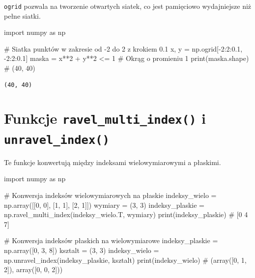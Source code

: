 \documentclass[
  polish,
  letterpaper,
  DIV=11,
  numbers=noendperiod]{scrreprt}
\newenvironment{Shaded}{\begin{snugshade}}{\end{snugshade}}
\newcommand{\BuiltInTok}[1]{\textcolor[rgb]{0.00,0.23,0.31}{#1}}
\newcommand{\CommentTok}[1]{\textcolor[rgb]{0.37,0.37,0.37}{#1}}
\newcommand{\DecValTok}[1]{\textcolor[rgb]{0.68,0.00,0.00}{#1}}
\newcommand{\FloatTok}[1]{\textcolor[rgb]{0.68,0.00,0.00}{#1}}
\newcommand{\ImportTok}[1]{\textcolor[rgb]{0.00,0.46,0.62}{#1}}
\newcommand{\NormalTok}[1]{\textcolor[rgb]{0.00,0.23,0.31}{#1}}
\newcommand{\OperatorTok}[1]{\textcolor[rgb]{0.37,0.37,0.37}{#1}}
\begin{document}
\texttt{ogrid} pozwala na tworzenie otwartych siatek, co jest pamięciowo
wydajniejsze niż pełne siatki.

\begin{Shaded}
\begin{Highlighting}[]
\ImportTok{import}\NormalTok{ numpy }\ImportTok{as}\NormalTok{ np}

\CommentTok{\# Siatka punktów w zakresie od {-}2 do 2 z krokiem 0.1}
\NormalTok{x, y }\OperatorTok{=}\NormalTok{ np.ogrid[}\OperatorTok{{-}}\DecValTok{2}\NormalTok{:}\DecValTok{2}\NormalTok{:}\FloatTok{0.1}\NormalTok{, }\OperatorTok{{-}}\DecValTok{2}\NormalTok{:}\DecValTok{2}\NormalTok{:}\FloatTok{0.1}\NormalTok{]}
\NormalTok{maska }\OperatorTok{=}\NormalTok{ x}\OperatorTok{**}\DecValTok{2} \OperatorTok{+}\NormalTok{ y}\OperatorTok{**}\DecValTok{2} \OperatorTok{\textless{}=} \DecValTok{1}  \CommentTok{\# Okrąg o promieniu 1}
\BuiltInTok{print}\NormalTok{(maska.shape)  }\CommentTok{\# (40, 40)}
\end{Highlighting}
\end{Shaded}

\begin{verbatim}
(40, 40)
\end{verbatim}

\section{\texorpdfstring{Funkcje \texttt{ravel\_multi\_index()} i
\texttt{unravel\_index()}}{Funkcje ravel\_multi\_index() i unravel\_index()}}\label{funkcje-ravel_multi_index-i-unravel_index}

Te funkcje konwertują między indeksami wielowymiarowymi a płaskimi.

\begin{Shaded}
\begin{Highlighting}[]
\ImportTok{import}\NormalTok{ numpy }\ImportTok{as}\NormalTok{ np}

\CommentTok{\# Konwersja indeksów wielowymiarowych na płaskie}
\NormalTok{indeksy\_wielo }\OperatorTok{=}\NormalTok{ np.array([[}\DecValTok{0}\NormalTok{, }\DecValTok{0}\NormalTok{], [}\DecValTok{1}\NormalTok{, }\DecValTok{1}\NormalTok{], [}\DecValTok{2}\NormalTok{, }\DecValTok{1}\NormalTok{]])}
\NormalTok{wymiary }\OperatorTok{=}\NormalTok{ (}\DecValTok{3}\NormalTok{, }\DecValTok{3}\NormalTok{)}
\NormalTok{indeksy\_plaskie }\OperatorTok{=}\NormalTok{ np.ravel\_multi\_index(indeksy\_wielo.T, wymiary)}
\BuiltInTok{print}\NormalTok{(indeksy\_plaskie)  }\CommentTok{\# [0 4 7]}

\CommentTok{\# Konwersja indeksów płaskich na wielowymiarowe}
\NormalTok{indeksy\_plaskie }\OperatorTok{=}\NormalTok{ np.array([}\DecValTok{0}\NormalTok{, }\DecValTok{3}\NormalTok{, }\DecValTok{8}\NormalTok{])}
\NormalTok{ksztalt }\OperatorTok{=}\NormalTok{ (}\DecValTok{3}\NormalTok{, }\DecValTok{3}\NormalTok{)}
\NormalTok{indeksy\_wielo }\OperatorTok{=}\NormalTok{ np.unravel\_index(indeksy\_plaskie, ksztalt)}
\BuiltInTok{print}\NormalTok{(indeksy\_wielo)  }\CommentTok{\# (array([0, 1, 2]), array([0, 0, 2]))}
\end{Highlighting}
\end{Shaded}
\end{document}
